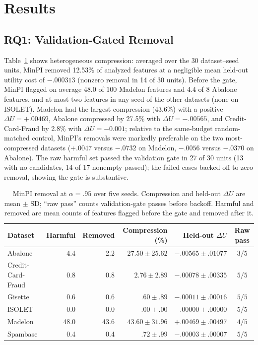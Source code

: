 \documentclass{article}
\newcommand{\CreditCompression}{2.8\%}
\newcommand{\CreditDeltaUtility}{-0.001}
\begin{document}
\section{Results}
\label{sec:results}

\subsection{RQ1: Validation-Gated Removal}

Table~\ref{tab:removal} shows heterogeneous compression: averaged over the 30 dataset--seed units, MinPI removed 12.53\% of analyzed features at a negligible mean held-out utility cost of $-.000313$ (nonzero removal in 14 of 30 units). Before the gate, MinPI flagged on average 48.0 of 100 Madelon features and 4.4 of 8 Abalone features, and at most two features in any seed of the other datasets (none on ISOLET). Madelon had the largest compression (43.6\%) with a positive $\Delta U=+.00469$, Abalone compressed by 27.5\% with $\Delta U=-.00565$, and Credit-Card-Fraud by \CreditCompression{} with $\Delta U=\CreditDeltaUtility{} $; relative to the same-budget random-matched control, MinPI's removals were markedly preferable on the two most-compressed datasets ($+.0047$ versus $-.0732$ on Madelon, $-.0056$ versus $-.0370$ on Abalone). The raw harmful set passed the validation gate in 27 of 30 units (13 with no candidates, 14 of 17 nonempty passed); the failed cases backed off to zero removal, showing the gate is substantive.

\begin{table}[htbp]
\caption{MinPI removal at $\alpha=.95$ over five seeds. Compression and held-out $\Delta U$ are mean $\pm$ SD; ``raw pass'' counts validation-gate passes before backoff. Harmful and removed are mean counts of features flagged before the gate and removed after it.}
\label{tab:removal}
\centering
\footnotesize
\begin{tabular}{lrrrrc}
\toprule
Dataset & Harmful & Removed & Compression (\%) & Held-out $\Delta U$ & Raw pass \\
\midrule
Abalone & 4.4 & 2.2 & $27.50\pm25.62$ & $-.00565\pm.01077$ & $3/5$ \\
Credit-Card-Fraud & 0.8 & 0.8 & $2.76\pm2.89$ & $-.00078\pm.00335$ & $5/5$ \\
Gisette & 0.6 & 0.6 & $.60\pm.89$ & $-.00011\pm.00016$ & $5/5$ \\
ISOLET & 0.0 & 0.0 & $.00\pm.00$ & $.00000\pm.00000$ & $5/5$ \\
Madelon & 48.0 & 43.6 & $43.60\pm31.96$ & $+.00469\pm.00497$ & $4/5$ \\
Spambase & 0.4 & 0.4 & $.72\pm.99$ & $-.00003\pm.00007$ & $5/5$ \\
\bottomrule
\end{tabular}
\end{table}
\end{document}
